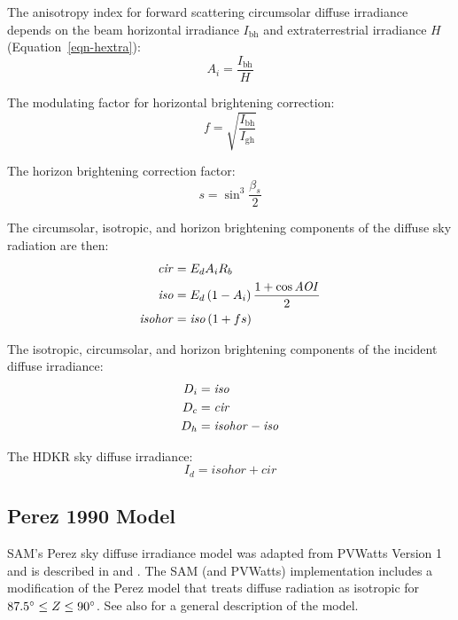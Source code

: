 \documentclass[12pt,letterpaper]{article}
\newcommand\AOI{\ensuremath{\mathit{AOI}}}
\begin{document}
The anisotropy index for forward scattering circumsolar diffuse irradiance depends on the beam horizontal irradiance $I_{\mathrm{bh}}$ and extraterrestrial irradiance $H$ (Equation~\ref{eqn-hextra}):
\begin{equation}
A_i = \frac{I_{\mathrm{bh}}}{H}
\end{equation}

The modulating factor for horizontal brightening correction:
\begin{equation}
f =\sqrt{\frac{I_{\mathrm{bh}}}{I_{\mathrm{gh}}}}
\end{equation}

The horizon brightening correction factor:
\begin{equation}
s =\sin^3\frac{\beta_s}{2}
\end{equation}

The circumsolar, isotropic, and horizon brightening components of the diffuse sky radiation are then:
\begin{align}
\mathit{cir} &= E_d A_i R_b \notag\\
\mathit{iso} &= E_d \left( 1 - A_i \right) \frac{1 + \cos\AOI}{2} \notag\\
\mathit{isohor} &= \mathit{iso} \left( 1 + f s \right)
\end{align}

The isotropic, circumsolar, and horizon brightening components of the incident diffuse irradiance:
\begin{align}
D_i &= \mathit{iso} \notag\\
D_c &= \mathit{cir} \notag\\
D_h &= \mathit{isohor} - \mathit{iso}
\end{align}

The HDKR sky diffuse irradiance:
\begin{equation}
I_d = \mathit{isohor} + \mathit{cir}
\end{equation}

\subsection{Perez 1990 Model}\label{sec-perez}

SAM's Perez sky diffuse irradiance model was adapted from PVWatts Version 1 \citep{dobos2013a} and is described in \citet{perez1988} and \citep{perez1990}. The SAM (and PVWatts) implementation includes a modification of the Perez model that treats diffuse radiation as isotropic for $87.5\degree \leq Z \leq 90\degree$. See also \citep{pvmcperez} for a general description of the model.
\end{document}
